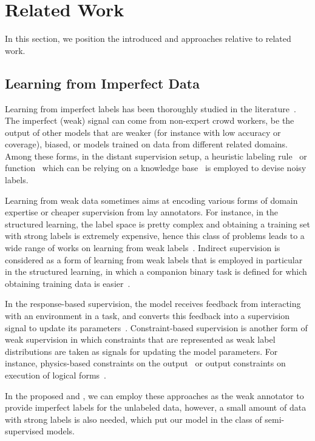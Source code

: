 \section{Related Work}
\label{sec:relatedwork}
In this section, we position the introduced \cws and \fwl approaches relative to related work.

\subsection{Learning from Imperfect Data}
Learning from imperfect labels has been thoroughly studied in the literature~\citep{Frenay:2014}.  The imperfect (weak) signal can come from non-expert crowd workers,  be the output of other models that are weaker (for instance with low accuracy or coverage), biased, or models trained on data from different related domains. 
%
Among these forms, in the distant supervision setup, a heuristic labeling rule~\citep{Deriu2016:SemEval,Severyn:2015:SemEval} or function~\citep{Dehghani:2017:SIGIR} which can be relying on a knowledge base~\citep{Mintz2009:distant,  min2013distant, Han:2016} is employed to devise noisy labels.  

Learning from weak data sometimes aims at encoding various forms of domain expertise or cheaper supervision from lay annotators. For instance, in the structured learning, the label space is pretty complex and obtaining a training set with strong labels is extremely expensive, hence this class of problems leads to a wide range of works on learning from weak labels~\citep{roth2017incidental}. 
%
Indirect supervision is considered as a form of learning from weak labels that is employed in particular in the structured learning, in which a companion binary task is defined for which obtaining training data is easier~\citep{Chang2010structured, Raghunathan:2016}. 

In the response-based supervision, the model receives feedback from interacting with an environment in a
task, and converts this feedback into a supervision
signal to update its parameters~\citep{roth2017incidental,clarke2010driving,riezler2014response}.
%
Constraint-based supervision is another form of weak supervision in which constraints that are represented as weak label distributions are taken as signals for updating the model parameters. For instance, physics-based constraints on the output~\citep{stewart2017label} or output constraints on execution of logical forms~\citep{clarke2010driving}.

In the proposed \cws and \fwl, we can employ these approaches as the weak annotator to provide imperfect labels for the unlabeled data, however, a small amount of data with strong labels is also needed, which put our model in the class of semi-supervised models. 

